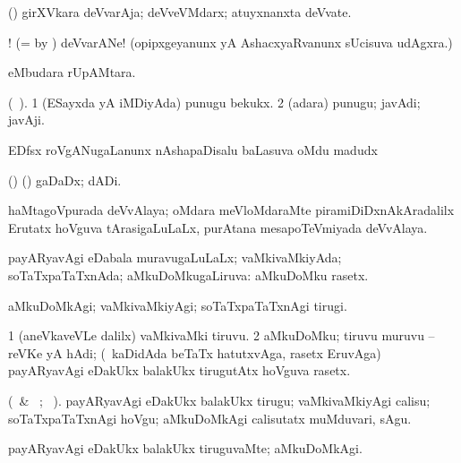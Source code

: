 \bentry
{} 
\gl{\nA}
\bmng
(\girxVpu) girXVkara deVvarAja; deVveVMdarx; atuyxnanxta deVvate.
\emng
	
\noindent
\gl{\pagu} 
\bmng
{}! (= by ) deVvarANe! (opipxgeyanunx yA AshacxyaRvanunx sUcisuva udAgxra.)
\emng
\eentry

\bentry
{} 
\gl{\nA} 
\bmng
{} eMbudara rUpAMtara.
\emng
\eentry

\bentry
{} 
\gl{\nA} 
\bmng
(\ame\ ). 
\bnum
\num{1} (ESayxda yA iMDiyAda) punugu bekukx. 
\num{2} (adara) punugu; javAdi; javAji.
\enum
\emng
\eentry

\bentry
{} 
\gl{\nA}
\bmng
EDfsx   roVgANugaLanunx nAshapaDisalu baLasuva oMdu madudx 
\emng
\eentry

\bentry
{} 
\gl{\nA}  
\bmng
(\AseTxrXV) (\ashi) gaDaDx; dADi.
\emng
\eentry

\bentry
{}  
\gl{\nA}
\bmng
haMtagoVpurada deVvAlaya; oMdara meVloMdaraMte piramiDiDxnAkAradalilx Erutatx hoVguva tArasigaLuLaLx, purAtana mesapoTeVmiyada deVvAlaya.\quad {}
\emng
\eentry

\bentry
{} 
\gl{\gu} 
\bmng
payARyavAgi eDabala muravugaLuLaLx; vaMkivaMkiyAda; soTaTxpaTaTxnAda; aMkuDoMkugaLiruva:  aMkuDoMku rasetx.
\emng
\eentry

\bentry
{} 
\gl{\kirxvi}  
\bmng
aMkuDoMkAgi; vaMkivaMkiyAgi; soTaTxpaTaTxnAgi tirugi.
\emng
\eentry

\bentry
{} 
\gl{\nA} 
\bmng
\bnum
\num{1} (aneVkaveVLe \bava dalilx) vaMkivaMki tiruvu. 
\num{2} aMkuDoMku; tiruvu muruvu -- reVKe yA hAdi; (\kanmu\ kaDidAda beTaTx hatutxvAga, rasetx  EruvAga) payARyavAgi eDakUkx balakUkx tirugutAtx hoVguva rasetx.
\enum
\emng
\eentry

\bentry
{} 
\gl{\akirx}    
\bmng
(\BU\ \& \BUkaq\ ; \vakaq\ ).
payARyavAgi eDakUkx balakUkx tirugu; vaMkivaMkiyAgi calisu; soTaTxpaTaTxnAgi hoVgu; aMkuDoMkAgi calisutatx  muMduvari, sAgu.
\emng
\eentry

\bentry
{} 
\gl{\kirxvi} 
\bmng
payARyavAgi eDakUkx balakUkx tiruguvaMte; {aMkuDoMkAgi}.
\emng
\eentry


